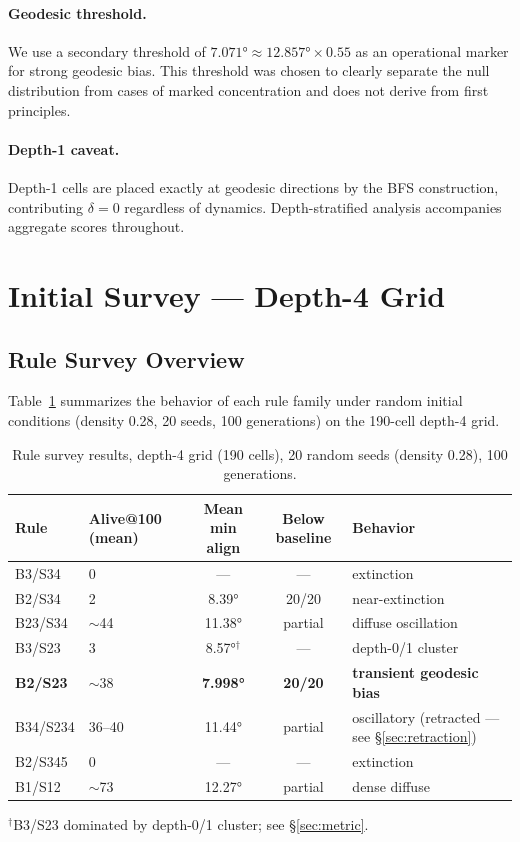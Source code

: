 \documentclass[12pt,a4paper]{article}
\begin{document}
\paragraph{Geodesic threshold.} We use a secondary threshold of $7.071°\approx12.857°\times 0.55$ as an operational marker for strong geodesic bias. This threshold was chosen to clearly separate the null distribution from cases of marked concentration and does not derive from first principles.

\paragraph{Depth-1 caveat.} Depth-1 cells are placed exactly at geodesic directions by the BFS construction, contributing $\delta=0$ regardless of dynamics. Depth-stratified analysis accompanies aggregate scores throughout.

\section{Initial Survey --- Depth-4 Grid}
\label{sec:survey}

\subsection{Rule Survey Overview}

Table~\ref{tab:survey} summarizes the behavior of each rule family under random initial conditions (density 0.28, 20 seeds, 100 generations) on the 190-cell depth-4 grid.

\begin{table}[h]
\centering
\caption{Rule survey results, depth-4 grid (190 cells), 20 random seeds (density 0.28), 100 generations.}
\label{tab:survey}
\begin{tabular}{llccl}
\toprule
Rule & Alive@100 (mean) & Mean min align & Below baseline & Behavior \\
\midrule
B3/S34   & 0    & ---    & ---   & extinction \\
B2/S34   & 2    & 8.39°  & 20/20 & near-extinction \\
B23/S34  & $\sim$44 & 11.38° & partial & diffuse oscillation \\
B3/S23   & 3    & 8.57°$^{\dagger}$ & --- & depth-0/1 cluster \\
\textbf{B2/S23} & $\sim$38 & \textbf{7.998°} & \textbf{20/20} & \textbf{transient geodesic bias} \\
B34/S234 & 36--40 & 11.44° & partial & oscillatory (retracted --- see \S\ref{sec:retraction}) \\
B2/S345  & 0    & ---    & ---   & extinction \\
B1/S12   & $\sim$73 & 12.27° & partial & dense diffuse \\
\bottomrule
\end{tabular}
\vspace{4pt}
\begin{flushleft}
\small $^{\dagger}$B3/S23 dominated by depth-0/1 cluster; see \S\ref{sec:metric}.
\end{flushleft}
\end{table}
\end{document}
